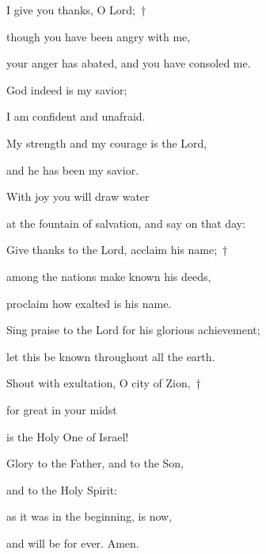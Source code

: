 \noindent I give you thanks, O Lord;~†~\nopagebreak

though you have been angry with me,~\GreStar{}~\nopagebreak

your anger has abated, and you have consoled me.

\noindent God indeed is my savior;~\GreStar{}~\nopagebreak

I am confident and unafraid.

\noindent My strength and my courage is the Lord,~\GreStar{}~\nopagebreak

and he has been my savior.

\noindent With joy you will draw water~\GreStar{}~\nopagebreak

at the fountain of salvation, and say on that day:

\noindent Give thanks to the Lord, acclaim his name;~†~\nopagebreak

among the nations make known his deeds,~\GreStar{}~\nopagebreak

proclaim how exalted is his name.

\noindent Sing praise to the Lord for his glorious achievement;~\GreStar{}~\nopagebreak

let this be known throughout all the earth.

\noindent Shout with exultation, O city of Zion,~†~\nopagebreak

for great in your midst~\GreStar{}~\nopagebreak

is the Holy One of Israel!

\noindent Glory to the Father, and to the Son,~\GreStar{}~\nopagebreak

and to the Holy Spirit:

\noindent as it was in the beginning, is now,~\GreStar{}~\nopagebreak

and will be for ever. Amen.
